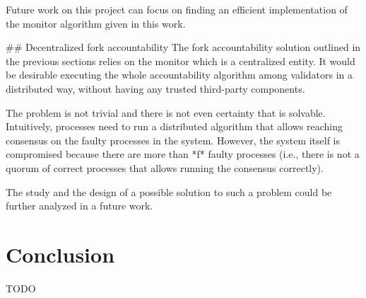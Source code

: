 \documentclass[a4paper,11pt,oneside]{report}
\begin{document}
\begin{markdown}
Future work on this project can focus on finding an efficient implementation of the monitor algorithm given in this work.  


## Decentralized fork accountability
The fork accountability solution outlined in the previous sections relies on the monitor which is a centralized entity. It would be desirable executing the whole accountability algorithm among validators in a distributed way, without having any trusted third-party components.

The problem is not trivial and there is not even certainty that is solvable. 
Intuitively, processes need to run a distributed algorithm that allows reaching consensus on the faulty processes in the system.
However, the system itself is compromised because there are more than *f* faulty processes (i.e., there is not a quorum of correct processes that allows running the consensus correctly).

The study and the design of a possible solution to such a problem could be further analyzed in a future work.


\end{markdown}


\chapter{Conclusion}

TODO

\cleardoublepage
{}
{}
\printbibliography

%
%
\end{document}
